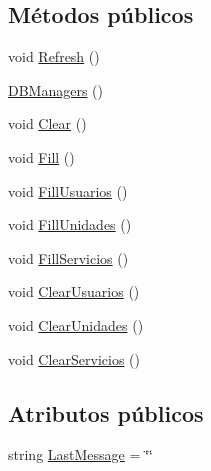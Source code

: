 \subsection*{Métodos públicos}
\begin{DoxyCompactItemize}
\item 
void \hyperlink{class_proyecto___integrador__3_1_1_d_b_managers_ab1d4758dc7cca9b54a51d63ec6e6589b}{Refresh} ()
\item 
\hyperlink{class_proyecto___integrador__3_1_1_d_b_managers_ae18ebe2d8858254a6077fbb32842f2ab}{D\-B\-Managers} ()
\item 
void \hyperlink{class_proyecto___integrador__3_1_1_d_b_managers_a2af606713823aab2912dd18c719aeb48}{Clear} ()
\item 
void \hyperlink{class_proyecto___integrador__3_1_1_d_b_managers_a3766dfbef6eb8494cf1fd9e28a135bd7}{Fill} ()
\item 
void \hyperlink{class_proyecto___integrador__3_1_1_d_b_managers_a27dce97a7e23ba80a56b545ccfeb73ee}{Fill\-Usuarios} ()
\item 
void \hyperlink{class_proyecto___integrador__3_1_1_d_b_managers_af664570cb8838acf770610b1d14eecea}{Fill\-Unidades} ()
\item 
void \hyperlink{class_proyecto___integrador__3_1_1_d_b_managers_af60e768a1ec8417d606d3e718d6a22d5}{Fill\-Servicios} ()
\item 
void \hyperlink{class_proyecto___integrador__3_1_1_d_b_managers_a51daa549b13a4bc2b6f12c0960286bae}{Clear\-Usuarios} ()
\item 
void \hyperlink{class_proyecto___integrador__3_1_1_d_b_managers_aa0c3c65b856fa31237f75b6a74194d03}{Clear\-Unidades} ()
\item 
void \hyperlink{class_proyecto___integrador__3_1_1_d_b_managers_ac449742a91d365aa025fd4f10db38604}{Clear\-Servicios} ()
\end{DoxyCompactItemize}
\subsection*{Atributos públicos}
\begin{DoxyCompactItemize}
\item 
string \hyperlink{class_proyecto___integrador__3_1_1_d_b_managers_aecf2d3981e87f16c1e3a60c7913931a8}{Last\-Message} = \char`\"{}\char`\"{}
\end{DoxyCompactItemize}
